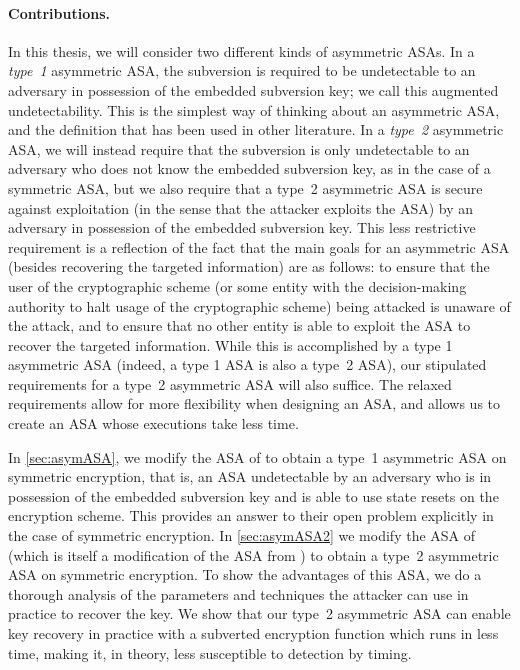 \paragraph{Contributions.}
In this thesis, we will consider two different kinds of asymmetric ASAs. In a \emph{type~1} asymmetric ASA, the subversion is required to be undetectable to an adversary in possession of the embedded subversion key; we call this augmented undetectability. This is the simplest way of thinking about an asymmetric ASA, and the definition that has been used in other literature. In a \emph{type~2} asymmetric ASA, we will instead require that the subversion is only undetectable to an adversary who does not know the embedded subversion key, as in the case of a symmetric ASA, but we also require that a type~2 asymmetric ASA is secure against exploitation (in the sense that the attacker exploits the ASA) by an adversary in possession of the embedded subversion key. This less restrictive requirement is a reflection of the fact that the main goals for an asymmetric ASA (besides recovering the targeted information) are as follows: to ensure that the user of the cryptographic scheme (or some entity with the decision-making authority to halt usage of the cryptographic scheme) being attacked is unaware of the attack, and to ensure that no other entity is able to exploit the ASA to recover the targeted information. While this is accomplished by a type 1 asymmetric ASA (indeed, a type 1 ASA is also a type~2 ASA), our stipulated requirements for a type~2 asymmetric ASA will also suffice. The relaxed requirements allow for more flexibility when designing an ASA, and allows us to create an ASA whose executions take less time.

In \autoref{sec:asymASA}, we modify the ASA of \cite{C:BelPatRog14} to obtain a type~1 asymmetric ASA on symmetric encryption, that is, an ASA undetectable by an adversary who is in possession of the embedded subversion key and is able to use state resets on the encryption scheme. This provides an answer to their open problem explicitly in the case of symmetric encryption. In \autoref{sec:asymASA2} we modify the ASA of \cite{CCS:BelJaeKan15} (which is itself a modification of the ASA from \cite{C:BelPatRog14}) to obtain a type~2 asymmetric ASA on symmetric encryption. To show the advantages of this ASA, we do a thorough analysis of the parameters and techniques the attacker can use in practice to recover the key. We show that our type~2 asymmetric ASA can enable key recovery in practice with a subverted encryption function which runs in less time, making it, in theory, less susceptible to detection by timing.

